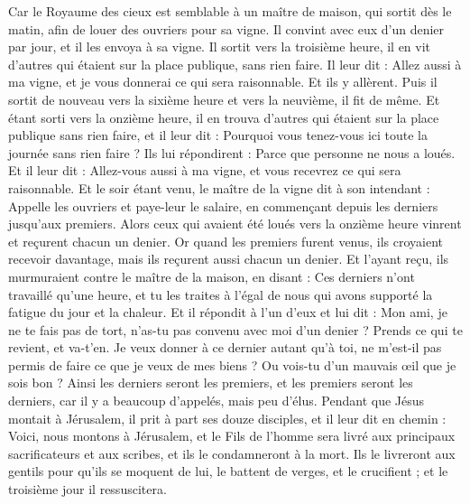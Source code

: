 \begin{multicols}{2}
\VerseOne{}Car le Royaume des cieux est semblable à un maître de maison, qui sortit dès le matin, afin de louer des ouvriers pour sa vigne.
Il convint avec eux d’un denier par jour, et il les envoya à sa vigne.
Il sortit vers la troisième heure, il en vit d'autres qui étaient sur la place publique, sans rien faire.
Il leur dit : Allez aussi à ma vigne, et je vous donnerai ce qui sera raisonnable.
Et ils y allèrent. Puis il sortit de nouveau vers la sixième heure et vers la neuvième, il fit de même.
Et étant sorti vers la onzième heure, il en trouva d'autres qui étaient sur la place publique sans rien faire, et il leur dit : Pourquoi vous tenez-vous ici toute la journée sans rien faire ?
Ils lui répondirent : Parce que personne ne nous a loués. Et il leur dit : Allez-vous aussi à ma vigne, et vous recevrez ce qui sera raisonnable.
Et le soir étant venu, le maître de la vigne dit à son intendant : Appelle les ouvriers et paye-leur le salaire, en commençant depuis les derniers jusqu’aux premiers.
Alors ceux qui avaient été loués vers la onzième heure vinrent et reçurent chacun un denier.
Or quand les premiers furent venus, ils croyaient recevoir davantage, mais ils reçurent aussi chacun un denier.
Et l'ayant reçu, ils murmuraient contre le maître de la maison,
en disant : Ces derniers n'ont travaillé qu'une heure, et tu les traites à l’égal de nous qui avons supporté la fatigue du jour et la chaleur.
Et il répondit à l'un d'eux et lui dit : Mon ami, je ne te fais pas de tort, n'as-tu pas convenu avec moi d’un denier ?
Prends ce qui te revient, et va-t’en. Je veux donner à ce dernier autant qu'à toi,
ne m'est-il pas permis de faire ce que je veux de mes biens ? Ou vois-tu d’un mauvais œil que je sois bon ?
Ainsi les derniers seront les premiers, et les premiers seront les derniers, car il y a beaucoup d'appelés, mais peu d'élus.
Pendant que Jésus montait à Jérusalem, il prit à part ses douze disciples, et il leur dit en chemin :
Voici, nous montons à Jérusalem, et le Fils de l'homme sera livré aux principaux sacrificateurs et aux scribes, et ils le condamneront à la mort.
Ils le livreront aux gentils pour qu’ils se moquent de lui, le battent de verges, et le crucifient ; et le troisième jour il ressuscitera.
\end{multicols}
